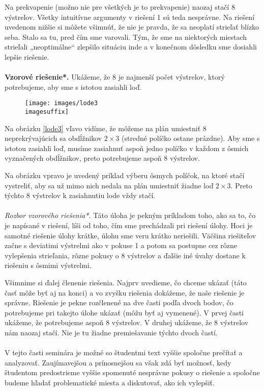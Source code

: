 {{Na prekvapenie (možno nie pre všetkých je to prekvapenie) naozaj stačí 8 výstrelov. Všetky intuitívne argumenty v riešení 1 sú teda nesprávne. Na riešení uvedenom nižšie si môžete všimnúť, že nie je pravda, že sa neoplatí strieľať blízko seba. Stalo sa tu, pred čím sme varovali. Tým, že sme na niektorých miestach strieľali „neoptimálne“ zlepšilo situáciu inde a v konečnom dôsledku sme dosiahli lepšie riešenie.\\
\\
\textbf{Vzorové riešenie*.} Ukážeme, že 8 je najmenší počet výstrelov, ktorý potrebujeme, aby sme s istotou zasiahli loď.

\begin{figure}[h]
    \centering
    \texttt{[image: images/lode3\\imagesuffix]}
    \caption{}
    \label{fig:lode3}
\end{figure}


Na obrázku \ref{lode3} vľavo vidíme, že môžeme na plán umiestniť 8 neprekrývajúcich sa obdĺžnikov $2\times 3$ (stredné políčko ostane prázdne). Aby sme s istotou zasiahli loď, musíme zasiahnuť aspoň jedno políčko v každom z ôsmich vyznačených obdĺžnikov, preto potrebujeme aspoň 8 výstrelov.

Na obrázku vpravo je uvedený príklad výberu ôsmych políčok, na ktoré stačí vystreliť, aby sa už mimo nich nedala na plán umiestniť žiadne loď $2\times3$. Preto týchto 8 výstrelov k zasiahnutiu lode vždy stačí.\\
\\
\textit{Rozbor vzorového riešenia*.} Táto úloha je pekným príkladom toho, ako sa to, čo je napísané v riešení, líši od toho, čím sme prechádzali pri riešení úlohy. Hoci je samotné riešenie úlohy krátke, úlohu sme veru krátko neriešili. Väčšina riešiteľov začne s deviatimi výstrelmi ako v pokuse 1 a potom sa postupne cez rôzne vylepšenia strieľania, rôzne pokusy o 8 výstrelov a ďalšie iné úvahy dostane k riešeniu s ôsmimi výstrelmi.

Všimnime si ďalej členenie riešenia. Najprv uvedieme, čo chceme ukázať (táto časť môže byť aj na konci) a vo zvyšku riešenia dokážeme, že naše riešenie je správne. Riešenie je pekne rozčlenené na dve časti podľa dvoch bodov, čo potrebujeme pri takejto úlohe ukázať (môžu byť aj vymenené). V prvej časti ukážeme, že potrebujeme aspoň 8 výstrelov. V druhej ukážeme, že 8 výstrelov nám naozaj stačí. Nie je tu žiadne premiešavanie týchto dvoch častí.\\
\\
\kom V tejto časti seminára je možné so študentmi text vyššie spoločne prečítať a analyzovať. Zaujímavejšou a prínosnejšou sa však zdá byť možnosť, kedy študentom predostrieme vyššie spomenuté nesprávne pokusy o riešenie a spoločne budeme hľadať problematické miesta a diskutovať, ako ich vylepšiť.
}

}
